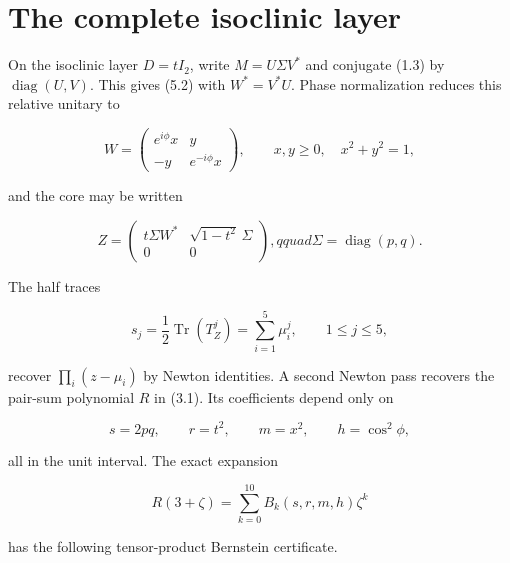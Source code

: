 \documentclass[11pt]{article}
\begin{document}
\section{The complete isoclinic layer}

On the isoclinic layer $D=tI_2$, write $M=U\Sigma V^*$ and conjugate (1.3) by $\operatorname{diag}(U,V)$. This gives (5.2) with $W^*=V^*U$. Phase normalization reduces this relative unitary to

\begin{equation}
W=\begin{pmatrix}e^{i\phi}x&y\\-y&e^{-i\phi}x\end{pmatrix},
\qquad x,y\ge0,\quad x^2+y^2=1,
\tag{5.1}
\end{equation}

and the core may be written

\begin{equation}
Z=\begin{pmatrix}
t\Sigma W^*&\sqrt{1-t^2}\,\Sigma\\0&0
\end{pmatrix},qquad
\Sigma=\operatorname{diag}(p,q).
\tag{5.2}
\end{equation}

The half traces

\begin{equation}
s_j=\frac12\operatorname{Tr}(T_Z^j)=\sum_{i=1}^5\mu_i^j,
\qquad1\le j\le5,
\tag{5.3}
\end{equation}

recover $\prod_i(z-\mu_i)$ by Newton identities. A second Newton pass recovers the pair-sum polynomial $R$ in (3.1). Its coefficients depend only on

\begin{equation}
s=2pq,\qquad r=t^2,\qquad m=x^2,\qquad h=\cos^2\phi,
\tag{5.4}
\end{equation}

all in the unit interval. The exact expansion

\begin{equation}
R(3+\zeta)=\sum_{k=0}^{10}B_k(s,r,m,h)\zeta^k
\tag{5.5}
\end{equation}

has the following tensor-product Bernstein certificate.
\end{document}
